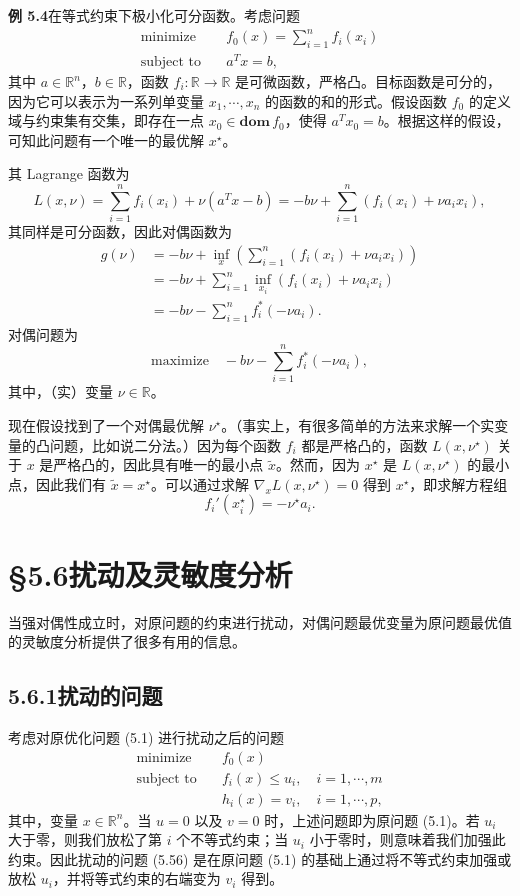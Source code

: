 \documentclass[UTF8, 12pt, fontset=fandol, oneside]{ctexart}
\begin{document}
\noindent\textbf{例 5.4}\quad 在等式约束下极小化可分函数。考虑问题
\[
\begin{aligned}
\text{minimize}\quad & f_0(x)=\sum_{i=1}^n f_i(x_i)\\
\text{subject to}\quad & a^Tx=b,
\end{aligned}
\]
其中 $a\in\mathbb{R}^n$，$b\in\mathbb{R}$，函数 $f_i:\mathbb{R}\to\mathbb{R}$ 是可微函数，严格凸。目标函数是可分的，因为它可以表示为一系列单变量 $x_1,\cdots,x_n$ 的函数的和的形式。假设函数 $f_0$ 的定义域与约束集有交集，即存在一点 $x_0\in\mathbf{dom}\,f_0$，使得 $a^Tx_0=b$。根据这样的假设，可知此问题有一个唯一的最优解 $x^\star$。

其 Lagrange 函数为
\[
L(x,\nu)=\sum_{i=1}^n f_i(x_i)+\nu(a^Tx-b)=-b\nu+\sum_{i=1}^n(f_i(x_i)+\nu a_i x_i),
\]
其同样是可分函数，因此对偶函数为
\[
\begin{aligned}
g(\nu)
&=-b\nu+\inf_x\left(\sum_{i=1}^n(f_i(x_i)+\nu a_ix_i)\right)\\
&=-b\nu+\sum_{i=1}^n\inf_{x_i}(f_i(x_i)+\nu a_ix_i)\\
&=-b\nu-\sum_{i=1}^n f_i^\ast(-\nu a_i).
\end{aligned}
\]
对偶问题为
\[
\text{maximize}\quad -b\nu-\sum_{i=1}^n f_i^\ast(-\nu a_i),
\]
其中，（实）变量 $\nu\in\mathbb{R}$。

现在假设找到了一个对偶最优解 $\nu^\star$。（事实上，有很多简单的方法来求解一个实变量的凸问题，比如说二分法。）因为每个函数 $f_i$ 都是严格凸的，函数 $L(x,\nu^\star)$ 关于 $x$ 是严格凸的，因此具有唯一的最小点 $\tilde{x}$。然而，因为 $x^\star$ 是 $L(x,\nu^\star)$ 的最小点，因此我们有 $\tilde{x}=x^\star$。可以通过求解 $\nabla_x L(x,\nu^\star)=0$ 得到 $x^\star$，即求解方程组
\[
f_i'(x_i^\star)=-\nu^\star a_i.
\]

\section*{§5.6\quad 扰动及灵敏度分析}

当强对偶性成立时，对原问题的约束进行扰动，对偶问题最优变量为原问题最优值的灵敏度分析提供了很多有用的信息。

\subsection*{5.6.1\quad 扰动的问题}

考虑对原优化问题 (5.1) 进行扰动之后的问题
\begin{equation}
\begin{aligned}
\text{minimize}\quad & f_0(x)\\
\text{subject to}\quad & f_i(x)\leq u_i,\quad i=1,\cdots,m\\
& h_i(x)=v_i,\quad i=1,\cdots,p,
\end{aligned}
\tag{5.56}
\end{equation}
其中，变量 $x\in\mathbb{R}^n$。当 $u=0$ 以及 $v=0$ 时，上述问题即为原问题 (5.1)。若 $u_i$ 大于零，则我们放松了第 $i$ 个不等式约束；当 $u_i$ 小于零时，则意味着我们加强此约束。因此扰动的问题 (5.56) 是在原问题 (5.1) 的基础上通过将不等式约束加强或放松 $u_i$，并将等式约束的右端变为 $v_i$ 得到。
\end{document}
